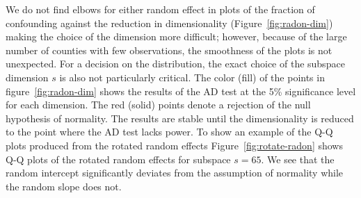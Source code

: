 \documentclass[12pt]{article} %
\newcommand{\hh}[1]{{\color{orange} #1}}
\newcommand{\al}[1]{{\color{red} #1}}
\begin{document}
%
We do not find elbows for either random effect in plots of the fraction of confounding against the reduction in dimensionality (Figure~\ref{fig:radon-dim}) making the choice of the dimension more difficult; however, because of the large number of counties with few observations, the smoothness of the plots is not unexpected. For a decision on the distribution, the exact choice of the subspace dimension $s$ is also not particularly critical. The color (fill) of the points in figure~\ref{fig:radon-dim} shows %
the results of the AD test at the 5\% significance level for each dimension. The red (solid) points denote a rejection of the null hypothesis of normality. %
The results are stable until the dimensionality is reduced to the point where  the AD test lacks power. To show an example of the Q-Q plots produced from the rotated random effects Figure~\ref{fig:rotate-radon} shows Q-Q plots of the rotated random effects for subspace $s = 65$. %
We see that the random intercept significantly deviates from the assumption of normality while the random slope does not.
\end{document}
